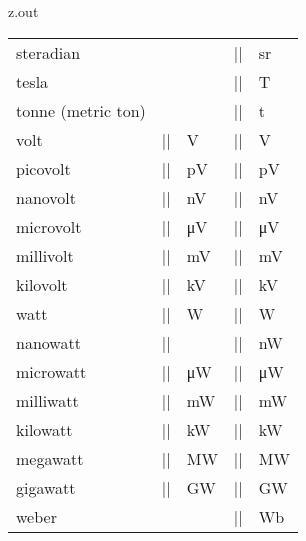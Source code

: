 \begin{VerbatimOut}{z.out}
{\begin{longtable}{@{}lllll@{}}
    steradian&            &        &             |\steradian|&          \unit{\steradian}\\[6pt]
    tesla&                &        &             |\tesla|&              \unit{\tesla}\\[6pt]
    tonne (metric ton)&   &        &             |\tonne|&              \unit{\tonne}\\[6pt]
    volt&                 |\V|&    \unit{\V}&    |\volt|&               \unit{\volt}\\
    \q picovolt&          |\pV|&   \unit{\pV}&   |\pico\volt|&          \unit{\pico\volt}\\
    \q nanovolt&          |\nV|&   \unit{\nV}&   |\nano\volt|&          \unit{\nano\volt}\\
    \q microvolt&         |\uV|&   \unit{\uV}&   |\micro\volt|&         \unit{\micro\volt}\\
    \q millivolt&         |\mV|&   \unit{\mV}&   |\milli\volt|&         \unit{\milli\volt}\\
    \q kilovolt&          |\kV|&   \unit{\kV}&   |\kilo\volt|&          \unit{\kilo\volt}\\[6pt]
    watt&                 |\W|&    \unit{\W}&    |\watt|&               \unit{\watt}\\
    \q nanowatt&          |\nW|&   \unit{\nW}&   |\nW|&                 \unit{\nano\watt}\\
    \q microwatt&         |\uW|&   \unit{\uW}&   |\micro\watt|&        \unit{\micro\watt}\\
    \q milliwatt&         |\mW|&   \unit{\mW}&   |\milli\watt|&        \unit{\milli\watt}\\
    \q kilowatt&          |\kW|&   \unit{\kW}&   |\kilo\watt|&         \unit{\kilo\watt}\\
    \q megawatt&          |\MW|&   \unit{\MW}&   |\mega\watt|&         \unit{\mega\watt}\\
    \q gigawatt&          |\GW|&   \unit{\GW}&   |\giga\watt|&         \unit{\giga\watt}\\[6pt]
    weber&                &        &             |\weber|&             \unit{\weber}\\
  \end{longtable}
}
\end{VerbatimOut}

\MyIO



